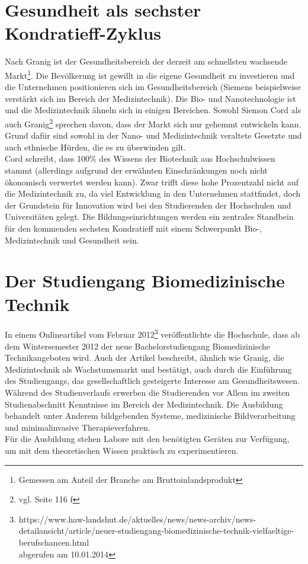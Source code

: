 \section{Gesundheit als sechster Kondratieff-Zyklus}

Nach Granig\cite{nefiodow:gesundheit} ist der Gesundheitsbereich der derzeit am schnellsten wachsende Markt\footnote{Gemessen am Anteil der Branche am Bruttoinlandsprodukt}. Die Bevölkerung ist gewillt in die eigene Gesundheit zu investieren und die Unternehmen positionieren sich im Gesundheitsbereich (Siemens beispielweise verstärkt sich im Bereich der Medizintechnik).
Die Bio- und Nanotechnologie ist und die Medizintechnik ähneln sich in einigen Bereichen. Sowohl Siemon Cord \cite{cord:innovation} als auch Granig\footnote{vgl. \cite{nefiodow:gesundheit} Seite 116 f} sprechen davon, dass der Markt sich nur gehemmt entwickeln kann. Grund dafür sind sowohl in der Nano- und Medizintechnik veraltete Gesetzte und auch ethnische Hürden, die es zu überwinden gilt.\\
Cord schreibt, dass 100\% des Wissens der Biotechnik aus Hochschulwissen stammt (allerdings aufgrund der erwähnten Einschränkungen noch nicht ökonomisch verwertet werden kann). Zwar trifft diese hohe Prozentzahl nicht auf die Medizintechnik zu, da viel Entwicklung in den Unternehmen stattfindet, doch der Grundstein für Innovation wird bei den Studierenden der Hochschulen und Universitäten gelegt. Die Bildungseinrichtungen werden ein zentrales Standbein für den kommenden sechsten Kondratieff mit einem Schwerpunkt Bio-, Medizintechnik und Gesundheit sein.

\section{Der Studiengang Biomedizinische Technik}\label{einleitung:biomedTechnik}
In einem Onlineartikel vom Februar 2012\footnote{https://www.haw-landshut.de/aktuelles/news/news-archiv/news-detailansicht/article/neuer-studiengang-biomedizinische-technik-vielfaeltige-berufschancen.html \\ abgerufen am 10.01.2014} veröffentlichte die Hochschule, dass ab dem Wintersemester 2012 der neue Bachelorstudiengang \glqq Biomedizinische Technik\grqq angeboten wird. Auch der Artikel beschreibt, ähnlich wie Granig, die Medizintechnik als Wachstumsmarkt und bestätigt, auch durch die Einführung des Studiengangs, das gesellschaftlich gesteigerte Interesse am Gesundheitswesen.\\
Während des Studienverlaufs \cite{hsla:modulBMT} erwerben die Studierenden vor Allem im zweiten Studienabschnitt Kenntnisse im Bereich der Medizintechnik. Die Ausbildung behandelt unter Anderem bildgebenden Systeme, medizinische Bildverarbeitung und minimalinvasive Therapieverfahren.\\
Für die Ausbildung stehen Labore mit den benötigten Geräten zur Verfügung, um mit dem theoretischen Wissen praktisch zu experimentieren.

